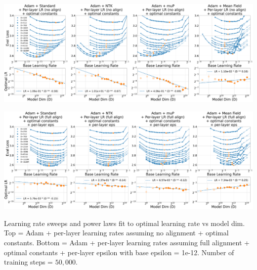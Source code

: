 \thispagestyle{plain}
\begin{SidewaysFigure}
\includegraphics[width=\linewidth]{icml2024/figures/lr_sweeps/appendix/adam/adam+50k_steps_per_module_lr_optimal_constants_no_align.pdf}

\figvspace

\includegraphics[width=\linewidth]{icml2024/figures/lr_sweeps/appendix/adam/adam+50k_steps_per_module_lr_optimal_constants_per_module_eps_base_eps12.pdf}
\caption{Learning rate sweeps and power laws fit to optimal learning rate vs model dim. Top = Adam + per-layer learning rates assuming no alignment + optimal constants. Bottom = Adam + per-layer learning rates assuming full alignment + optimal constants + per-layer epsilon with base epsilon = 1e-12. Number of training steps = $50{,}000$.}
\end{SidewaysFigure}
\clearpage


